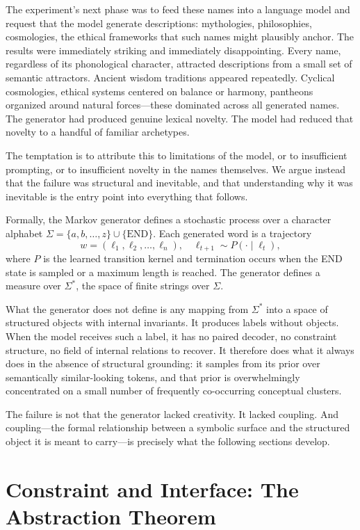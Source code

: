\documentclass[12pt, a4paper]{article}
\theoremstyle{plain}
\theoremstyle{definition}
\theoremstyle{remark}
\begin{document}
The experiment's next phase was to feed these names into a language model and request that the model generate descriptions: mythologies, philosophies, cosmologies, the ethical frameworks that such names might plausibly anchor. The results were immediately striking and immediately disappointing. Every name, regardless of its phonological character, attracted descriptions from a small set of semantic attractors. Ancient wisdom traditions appeared repeatedly. Cyclical cosmologies, ethical systems centered on balance or harmony, pantheons organized around natural forces---these dominated across all generated names. The generator had produced genuine lexical novelty. The model had reduced that novelty to a handful of familiar archetypes.

The temptation is to attribute this to limitations of the model, or to insufficient prompting, or to insufficient novelty in the names themselves. We argue instead that the failure was structural and inevitable, and that understanding why it was inevitable is the entry point into everything that follows.

Formally, the Markov generator defines a stochastic process over a character alphabet $\Sigma = \{a, b, \dots, z\} \cup \{\mathrm{END}\}$. Each generated word is a trajectory
\[
w = (\ell_1, \ell_2, \dots, \ell_n), \quad \ell_{t+1} \sim P(\cdot \mid \ell_t),
\]
where $P$ is the learned transition kernel and termination occurs when the END state is sampled or a maximum length is reached. The generator defines a measure over $\Sigma^*$, the space of finite strings over $\Sigma$.

What the generator does not define is any mapping from $\Sigma^*$ into a space of structured objects with internal invariants. It produces labels without objects. When the model receives such a label, it has no paired decoder, no constraint structure, no field of internal relations to recover. It therefore does what it always does in the absence of structural grounding: it samples from its prior over semantically similar-looking tokens, and that prior is overwhelmingly concentrated on a small number of frequently co-occurring conceptual clusters.

The failure is not that the generator lacked creativity. It lacked coupling. And coupling---the formal relationship between a symbolic surface and the structured object it is meant to carry---is precisely what the following sections develop.

\section{Constraint and Interface: The Abstraction Theorem}
\end{document}
